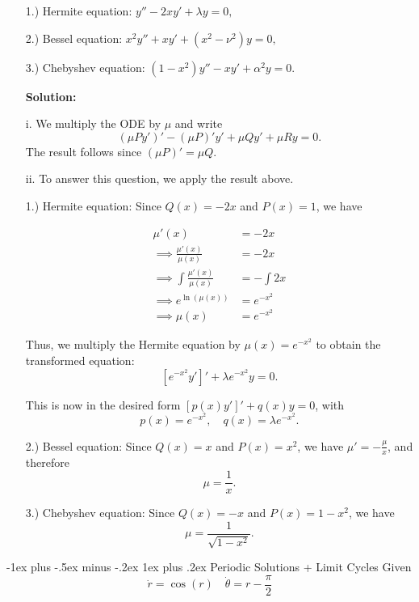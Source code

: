\documentclass[10pt,landscape]{article}
\makeatletter
\renewcommand{\subsubsection}{\@startsection{subsubsection}{3}{0mm}%
                                {-1ex plus -.5ex minus -.2ex}%
                                {1ex plus .2ex}%
                                {\normalfont\small\bfseries}}
\makeatother
\begin{document}
\begin{multicols}{2}
\begin{enumerate}
\item[1.)] Hermite equation: \( y'' - 2xy' + \lambda y = 0, \)
\item[2.)] Bessel equation: \( x^2 y'' + x y' + (x^2 - \nu^2) y = 0, \)
\item[3.)] Chebyshev equation: \( (1 - x^2) y'' - x y' + \alpha^2 y = 0. \)


\textbf{Solution:}

i. We multiply the ODE by \( \mu \) and write\\
\[
(\mu P y')' - (\mu P)' y' + \mu Q y' + \mu R y = 0.
\]
The result follows since \( (\mu P)' = \mu Q. \)

ii. To answer this question, we apply the result above.

\item[1.)] Hermite equation: Since \( Q(x) = -2x \) and \( P(x) = 1 \), we have 

\begin{align*}
    \mu'(x) &= -2x\\
    \implies \frac{\mu'(x)}{\mu(x)} &= -2x\\
    \implies \int \frac{\mu'(x)}{\mu(x)} &= -\int 2x\\
    \implies e^{\ln(\mu(x))} &= e^{-x^2}\\
    \implies \mu(x) &= e^{-x^2}
\end{align*}

Thus, we multiply the Hermite equation by \( \mu(x) = e^{-x^2} \) to obtain the transformed equation:\\
\[
\left[ e^{-x^2} y' \right]' + \lambda e^{-x^2} y = 0.
\]

This is now in the desired form \( \left[ p(x) y' \right]' + q(x) y = 0 \), with\\
\[
p(x) = e^{-x^2}, \quad q(x) = \lambda e^{-x^2}.
\]

\item[2.)] Bessel equation: Since \( Q(x) = x \) and \( P(x) = x^2 \), we have \( \mu' = - \frac{\mu}{x} \), and therefore\\
\[
\mu = \frac{1}{x}.
\]

\item[3.)] Chebyshev equation: Since \( Q(x) = -x \) and \( P(x) = 1 - x^2 \), we have\\
\[
\mu = \frac{1}{\sqrt{1 - x^2}}.
\]
\end{enumerate}

\subsubsection{Periodic Solutions + Limit Cycles}
Given \\$$\dot{r} = \cos(r) \quad \dot{\theta} = r-\frac{\pi}{2}$$


\end{multicols}
\end{document}
